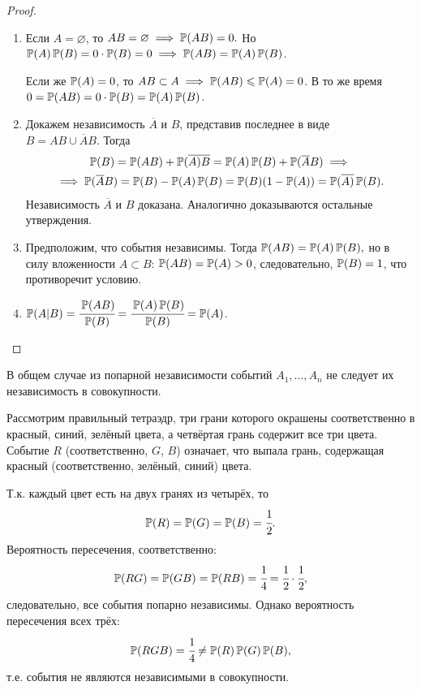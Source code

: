 \begin{proof}
	\begin{enumerate} 
		\item 
		      Если $A = \varnothing$, то $AB = \varnothing \implies \operatorname{\mathbb{P}}(AB) = 0.$ Но $ \operatorname{\mathbb{P}}(A)\operatorname{\mathbb{P}}(B) = 0 \cdot \operatorname{\mathbb{P}}(B) = 0 \implies \operatorname{\mathbb{P}}(AB) = \operatorname{\mathbb{P}}(A) \operatorname{\mathbb{P}}(B)$.
		              
		      Если же ${\operatorname{\mathbb{P}}(A) = 0}$, то ${AB \subset A \implies \operatorname{\mathbb{P}}(AB) \leqslant \operatorname{\mathbb{P}}(A) = 0}$. 
		      В то же время ${0 = \operatorname{\mathbb{P}}(AB) = 0 \cdot \operatorname{\mathbb{P}}(B) = \operatorname{\mathbb{P}}(A) \operatorname{\mathbb{P}}(B)}$.
		\item 
		      Докажем независимость $\overline{A}$ и $B$, представив последнее в виде \\
		      $B = AB \cup \overline{A}B$. Тогда
		      \begin{multline*}
		      	\operatorname{\mathbb{P}}(B) = \operatorname{\mathbb{P}}(AB) + \operatorname{\mathbb{P}}(\overline{A)B} = \operatorname{\mathbb{P}}(A)\operatorname{\mathbb{P}}(B) + \operatorname{\mathbb{P}}(\overline{A}B) \implies \\
		      	\implies \operatorname{\mathbb{P}}(\overline{A}B) = \operatorname{\mathbb{P}}(B) - \operatorname{\mathbb{P}}(A)\operatorname{\mathbb{P}}(B) = \operatorname{\mathbb{P}}(B) (1 - \operatorname{\mathbb{P}}(A)) = \operatorname{\mathbb{P}}(\overline{A)}\operatorname{\mathbb{P}}(B).
		      \end{multline*}
		      Независимость $\overline{A}$ и $B$ доказана. 
		      Аналогично доказываются остальные утверждения.
		\item 
		      Предположим, что события независимы. 
		      Тогда $\operatorname{\mathbb{P}}(AB) = \operatorname{\mathbb{P}}(A)\operatorname{\mathbb{P}}(B),$ но в силу вложенности $A \subset B$: $\operatorname{\mathbb{P}}(AB) = \operatorname{\mathbb{P}}(A) > 0$, следовательно, $\operatorname{\mathbb{P}}(B) = 1$, что противоречит условию.
		\item 
		      $\operatorname{\mathbb{P}}(A | B) = \cfrac{\operatorname{\mathbb{P}}(AB)}{\operatorname{\mathbb{P}}(B)} = \cfrac{\operatorname{\mathbb{P}}(A)\operatorname{\mathbb{P}}(B)}{\operatorname{\mathbb{P}}(B)} = \operatorname{\mathbb{P}}(A)$.
	\end{enumerate}
\end{proof}

\begin{rmrk}
	В общем случае из попарной независимости событий $A_1, \ldots, A_n$ не следует их независимость в совокупности.
	\begin{exmp}
		Рассмотрим правильный тетраэдр, три грани которого окрашены соответственно в красный, синий, зелёный цвета, а четвёртая грань содержит все три цвета. 
		Событие $R$ (соответственно, $G$, $B$) означает, что выпала грань, содержащая красный (соответственно, зелёный, синий) цвета.
		
		Т.к. каждый цвет есть на двух гранях из четырёх, то
		\begin{equation*}
			\operatorname{\mathbb{P}}(R) = \operatorname{\mathbb{P}}(G) = \operatorname{\mathbb{P}}(B) = \cfrac{1}{2}.
		\end{equation*}
		Вероятность пересечения, соответственно:
		\begin{equation*}
			\operatorname{\mathbb{P}}(RG) = \operatorname{\mathbb{P}}(GB) = \operatorname{\mathbb{P}}(RB) = \cfrac{1}{4} = \cfrac{1}{2} \cdot \cfrac{1}{2},
		\end{equation*}
		следовательно, все события попарно независимы. 
		Однако вероятность пересечения всех трёх:
		\begin{equation*}
			\operatorname{\mathbb{P}}(RGB)  = \cfrac{1}{4} \neq \operatorname{\mathbb{P}}(R) \operatorname{\mathbb{P}}(G) \operatorname{\mathbb{P}}(B),
		\end{equation*}
		т.е. события не являются независимыми в совокупности. 
	\end{exmp}
\end{rmrk}


